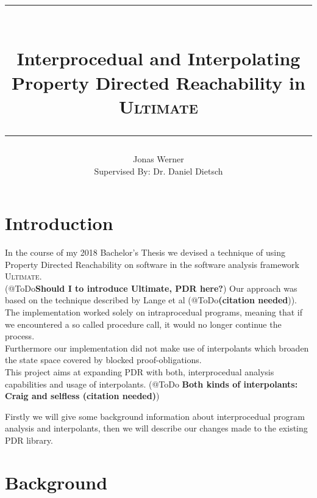 \documentclass{article}
\begin{document}
	\newcommand{\HorizontalLine}{\rule{\linewidth}{0.3mm}}
	
	\title{ \HorizontalLine \\ \textbf{Interprocedual and Interpolating \\ Property Directed Reachability in \textsc{Ultimate}} \HorizontalLine}
	

	
	\author{Jonas Werner \\ Supervised By: Dr. Daniel Dietsch}


	
	\date{}
	
	\maketitle
	
	\begin{abstract}
	
	\end{abstract}
	
	
	\section{Introduction}
	
	In the course of my 2018 Bachelor's Thesis we devised a technique of using Property Directed Reachability on software in the software analysis framework \textsc{Ultimate}. \\
	(@ToDo\textbf{Should I to introduce Ultimate, PDR here?})
	Our approach was based on the technique described by Lange et al (@ToDo\textbf{(citation needed})).
	The implementation worked solely on intraprocedual programs, meaning that if we encountered a so called procedure call, it would no longer continue the process. \\
	Furthermore our implementation did not make use of interpolants which broaden the state space covered by blocked proof-obligations. \\
	This project aims at expanding PDR with both, interprocedual analysis capabilities and usage of interpolants. (@ToDo \textbf{Both kinds of interpolants: Craig and selfless (citation needed)}) \par
	Firstly we will give some background information about interprocedual program analysis and interpolants, then we will describe our changes made to the existing PDR library.
	
	\section{Background}
\end{document}
